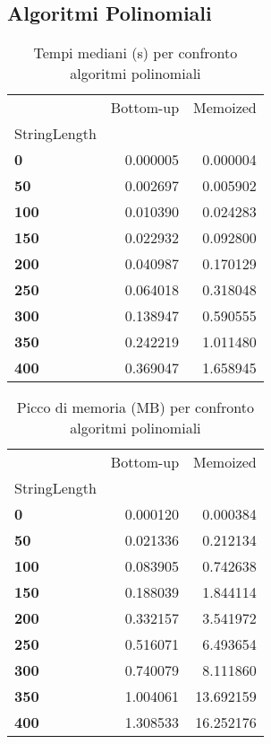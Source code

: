 \documentclass[a4paper, 11pt]{article}
\begin{document}
\subsection{Algoritmi Polinomiali}
\begin{center}
\begin{table}[H]
\caption{Tempi mediani (s) per confronto algoritmi polinomiali}
\label{tab:confronto_tempi_polinomiali}
\begin{tabular}{l|r|r}
\toprule
 & Bottom-up & Memoized \\
StringLength &  &  \\
\midrule
\textbf{0} & 0.000005 & 0.000004 \\
\textbf{50} & 0.002697 & 0.005902 \\
\textbf{100} & 0.010390 & 0.024283 \\
\textbf{150} & 0.022932 & 0.092800 \\
\textbf{200} & 0.040987 & 0.170129 \\
\textbf{250} & 0.064018 & 0.318048 \\
\textbf{300} & 0.138947 & 0.590555 \\
\textbf{350} & 0.242219 & 1.011480 \\
\textbf{400} & 0.369047 & 1.658945 \\
\bottomrule
\end{tabular}
\end{table}
\end{center}

\begin{center}
\begin{table}[H]
\caption{Picco di memoria (MB) per confronto algoritmi polinomiali}
\label{tab:confronto_memoria_polinomiali}
\begin{tabular}{l|r|r}
\toprule
 & Bottom-up & Memoized \\
StringLength &  &  \\
\midrule
\textbf{0} & 0.000120 & 0.000384 \\
\textbf{50} & 0.021336 & 0.212134 \\
\textbf{100} & 0.083905 & 0.742638 \\
\textbf{150} & 0.188039 & 1.844114 \\
\textbf{200} & 0.332157 & 3.541972 \\
\textbf{250} & 0.516071 & 6.493654 \\
\textbf{300} & 0.740079 & 8.111860 \\
\textbf{350} & 1.004061 & 13.692159 \\
\textbf{400} & 1.308533 & 16.252176 \\
\bottomrule
\end{tabular}
\end{table}
\end{center}
\end{document}
